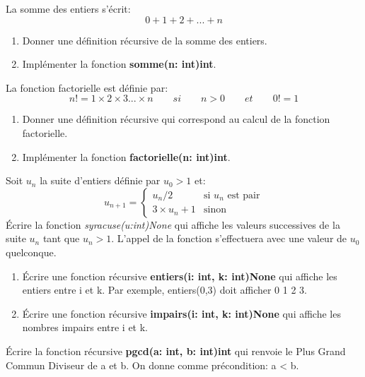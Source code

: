 \documentclass[a4paper,11pt]{article}
\begin{document}
\begin{Form}
\begin{exo}
La somme des entiers s'écrit:
$$0+1+2+...+n$$
\begin{enumerate}
\item Donner une définition récursive de la somme des entiers.
\item Implémenter la fonction \textbf{somme(n: int)\;\rightarrow\;int}.
\end{enumerate}
\end{exo}
\begin{exo}
La fonction factorielle est définie par:
$$n!=1×2×3...×n \qquad si\qquad n>0 \qquad et \qquad 0!=1$$
\begin{enumerate}
\item Donner une définition récursive qui correspond au calcul de la fonction factorielle.
\item Implémenter la fonction \textbf{factorielle(n: int)\;\rightarrow\;int}.
\end{enumerate}
\end{exo}
\begin{exo}
Soit $u_n$ la suite d'entiers définie par $u_0>1$ et:
$$
u_{n+1} = \left\{
    \begin{array}{ll}
        u_n/2 & \mbox{si  }u_n \mbox{ est pair}\\
        3×u_n+1 & \mbox{sinon}\
    \end{array}
\right.
$$
Écrire la fonction \emph{syracuse(u:int)\;\rightarrow\;None} qui affiche les valeurs successives de la suite $u_n$ tant que $u_n>1$. L'appel de la fonction s'effectuera avec une valeur de $u_0$ quelconque.
\end{exo}
\begin{exo}
\begin{enumerate}
\item Écrire une fonction récursive \textbf{entiers(i: int, k: int)\;\rightarrow\;None} qui affiche les entiers entre i et k. Par exemple, entiers(0,3) doit afficher 0 1 2 3.
\item Écrire une fonction récursive \textbf{impairs(i: int, k: int)\;\rightarrow\;None} qui affiche les nombres impairs entre i et k.
\end{enumerate}
\end{exo}
\begin{exo}
Écrire la fonction récursive \textbf{pgcd(a: int, b: int)\;\rightarrow\;int} qui renvoie le Plus Grand Commun Diviseur de a et b. On donne comme précondition: a < b.
\begin{commentprof}

\end{commentprof}
\end{exo}
\end{Form}
\end{document}
